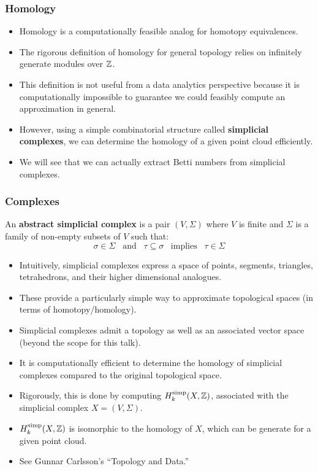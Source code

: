 		\begin{frame}
		\frametitle{Homology}
		
		\begin{itemize}
			\item Homology is a computationally feasible analog for homotopy equivalences.
			\item The rigorous definition of homology for general topology relies on infinitely generate modules over $\mathbb{Z}$.
			\item This definition is not useful from a data analytics perspective because it is computationally impossible to guarantee
			we could feasibly compute an approximation in general.
			\item However, using a simple combinatorial structure called \textbf{simplicial complexes}, we can determine the homology of a given point cloud efficiently.
			\item We will see that we can actually extract Betti numbers from simplicial complexes.
		\end{itemize}
		\end{frame}
			
		\begin{frame}
		\frametitle{Complexes}
		\begin{defn}
		An \textbf{abstract simplicial complex} is a pair $(V,\Sigma)$ where $V$ is finite and $\Sigma$ is a family of non-empty subsets of $V$ such that:
		$$\sigma\in\Sigma \;\;\;\text{and}\;\;\; \tau\subseteq\sigma \;\;\;\text{implies}\;\;\; \tau\in\Sigma$$
		\end{defn}
		
		\begin{itemize}
			\item Intuitively, simplicial complexes express a space of points, segments, triangles, tetrahedrons, and their higher dimensional analogues.
			\item These provide a particularly simple way to approximate topological spaces (in terms of homotopy/homology).
			\item Simplicial complexes admit a topology as well as an associated vector space (beyond the scope for this talk).
			\item It is computationally efficient to determine the homology of simplicial complexes compared to the original topological space.
			\item Rigorously, this is done by computing $H_k^{\text{simp}}(X,\mathbb{Z})$, associated with the simplicial complex $X=(V,\Sigma)$.
			\item $H_k^{\text{simp}}(X,\mathbb{Z})$ is isomorphic to the homology of $X$, which can be generate for a given point cloud.
			\item See Gunnar Carlsson's ``Topology and Data.''
		\end{itemize}
		
		\end{frame}
			
